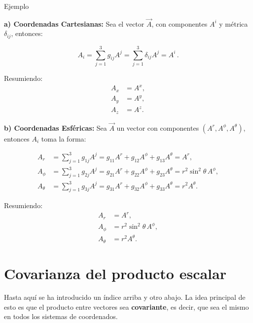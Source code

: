 \documentclass[../apunte_mecanica_clasica.tex]{subfiles}%
\begin{document}
\begin{apuntebloque}{Ejemplo}

\textbf{a) Coordenadas Cartesianas:}  
Sea el vector $\vec{A}$, con componentes $A^i$ y métrica $\delta_{ij}$, entonces:

\begin{equation*}
    A_i = \sum_{j=1}^3 g_{ij} A^j = \sum_{j=1}^3 \delta_{ij} A^j = A^i \,.
\end{equation*}

Resumiendo:
\begin{align*}
    A_x &= A^x, \\
    A_y &= A^y, \\
    A_z &= A^z.
\end{align*}

\end{apuntebloque}
\begin{apuntebloque}{}

\textbf{b) Coordenadas Esféricas:}  
Sea $\vec{A}$ un vector con componentes $(A^r, A^\phi, A^\theta)$, entonces $A_i$ toma la forma:

\begin{align*}
    A_r &= \sum_{j=1}^3 g_{1j} A^j = g_{11}A^r + g_{12}A^\phi + g_{13}A^\theta = A^r, \\[4pt]
    A_\phi &= \sum_{j=1}^3 g_{2j} A^j = g_{21}A^r + g_{22}A^\phi + g_{23}A^\theta = r^2 \sin^2\theta \, A^\phi, \\[4pt]
    A_\theta &= \sum_{j=1}^3 g_{3j} A^j = g_{31}A^r + g_{32}A^\phi + g_{33}A^\theta = r^2 A^\theta.
\end{align*}

Resumiendo:
\begin{align*}
    A_r &= A^r, \\
    A_\phi &= r^2 \sin^2\theta \, A^\phi, \\
    A_\theta &= r^2 A^\theta.
\end{align*}

\end{apuntebloque}


\newpage

\section{Covarianza del producto escalar}

Hasta aquí se ha introducido un índice arriba y otro abajo.  
La idea principal de esto es que el producto entre vectores sea 
\textbf{covariante}, es decir, que sea el mismo en todos los sistemas de coordenados.  
\end{document}
